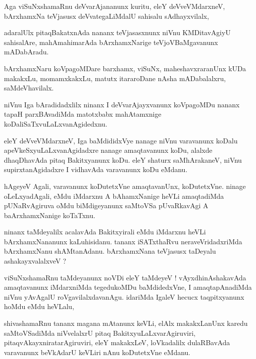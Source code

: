 \documentclass{article}
\begin{document}
\begin{mn}
Aga viSuNxshamaRnu deVvarAjananunx kuritu, eleY deVveVMdarxneV,
bArxhamxNa teVjasusx deVvategaLiMdalU sahisalu sAdhayxvilalx,
\end{mn}

\begin{mn}
adaralUlx pitaqBakatxnAda nananx teVjasasxnunx niVnu KMDitavAgiyU
sahisalAre, mahAmahimarAda bArxhamxNarige teVjoVBaMgavanunx mADabAradu.
\end{mn}

\begin{mn}
bArxhamxNaru koVpagoMDare barxhamx, viSuNx, maheshavxraranUnx kUDa makakxLu,
momamxkakxLu, matutx itararoDane nAsha mADabalalxru, saMdeVhavilalx.
\end{mn}

\begin{mn}
niVnu Iga bAradidadxlilx ninanx I deVvarAjayxvanunx koVpagoMDu nananx 
tapaH parxBAvadiMda matotxbabx mahAtamxnige koDaliSaTxvuLaLxvanAgidedxnu.
\end{mn}

\begin{mn}
eleY deVveVMdarxneV, Iga baMdididxVye nanage niVnu varavanunx koDalu
apeVkeSxyuLaLxvanAgidadxre nanage amaqtavanunx koDu, alalxde dhaqDhavAda
pitaq Bakitxyanunx koDu. eleY shaturx saMhArakaneV, niVnu 
supirxtanAgidadxre I vidhavAda varavanunx koDu eMdanu.
\end{mn}

\begin{mn}
hAgeyeV Agali, varavanunx koDutetxVne amaqtavanUnx, koDutetxVne. ninage
oLeLxyadAgali, eMdu iMdarxnu A bAhamxNanige heVLi amaqtadiMda 
pUNaRvAgiruva oMdu biMdigeyanunx saMtoVSa pUvaRkavAgi A baArxhamxNanige koTaTxnu.
\end{mn}

\begin{mn}
ninanx taMdeyalilx acalavAda Bakitxyirali eMdu iMdarxnu heVLi bArxhamxNananunx
kaLuhisidanu. tananx iSATxthaRvu neraveVridadxriMda bArxhamxNanu 
shAMtanAdanu. bArxhamxNana teVjasusx taDeyalu ashakayxvalalxveV ?
\end{mn}

\begin{mn}
viSuNxshamaRnu taMdeyanunx noVDi eleY taMdeyeV ! vAyxdhinAshakavAda
amaqtavanunx iMdarxniMda tegedukoMDu baMdidedxVne, I amaqtapAnadiMda
niVnu yAvAgalU roVgavilalxdavanAgu. idariMda IgaleV hecucx taqpitxyanunx 
hoMdu eMdu heVLalu, 
\end{mn}

\begin{mn}
shivashamaRnu tananx magana mAtanunx keVLi, elAlx makakxLanUnx karedu 
saMtoVSadiMda niVvelalxrU pitaq BakitxyuLaLxvarAgiruviri, 
pitaqvAkayxniratarAgiruviri, eleY makakxLeV, loVkadalilx dulaRBavAda
varavanunx beVkAdarU keVLiri nAnu koDutetxVne eMdanu. 
\end{mn}
\end{document}
